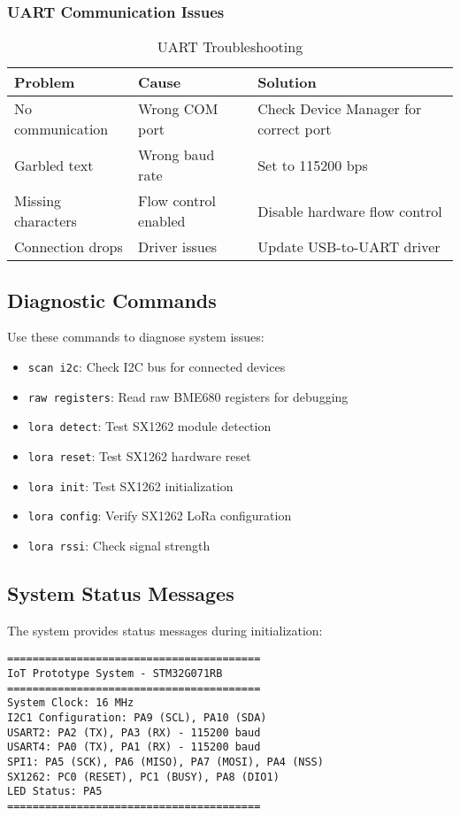 \documentclass[11pt,a4paper]{article}
\newcommand{\command}[1]{\texttt{#1}}
\begin{document}
\subsubsection{UART Communication Issues}
\begin{table}[h]
\centering
\begin{tabular}{|l|l|l|}
\hline
\textbf{Problem} & \textbf{Cause} & \textbf{Solution} \\
\hline
No communication & Wrong COM port & Check Device Manager for correct port \\
\hline
Garbled text & Wrong baud rate & Set to 115200 bps \\
\hline
Missing characters & Flow control enabled & Disable hardware flow control \\
\hline
Connection drops & Driver issues & Update USB-to-UART driver \\
\hline
\end{tabular}
\caption{UART Troubleshooting}
\end{table}

\subsection{Diagnostic Commands}
Use these commands to diagnose system issues:

\begin{itemize}
    \item \command{scan i2c}: Check I2C bus for connected devices
    \item \command{raw registers}: Read raw BME680 registers for debugging
    \item \command{lora detect}: Test SX1262 module detection
    \item \command{lora reset}: Test SX1262 hardware reset
    \item \command{lora init}: Test SX1262 initialization
    \item \command{lora config}: Verify SX1262 LoRa configuration
    \item \command{lora rssi}: Check signal strength
\end{itemize}

\subsection{System Status Messages}
The system provides status messages during initialization:

\begin{lstlisting}[caption=System Initialization Messages]
========================================
IoT Prototype System - STM32G071RB
========================================
System Clock: 16 MHz
I2C1 Configuration: PA9 (SCL), PA10 (SDA)
USART2: PA2 (TX), PA3 (RX) - 115200 baud
USART4: PA0 (TX), PA1 (RX) - 115200 baud
SPI1: PA5 (SCK), PA6 (MISO), PA7 (MOSI), PA4 (NSS)
SX1262: PC0 (RESET), PC1 (BUSY), PA8 (DIO1)
LED Status: PA5
========================================
\end{lstlisting}
\end{document}
